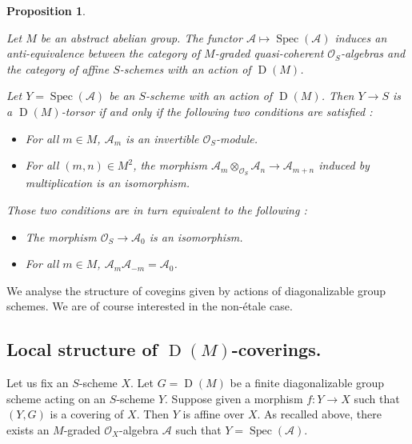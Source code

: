 \documentclass{amsart}
\newtheorem{prop}{Proposition}[section]
\theoremstyle{definition}
\theoremstyle{remark}
\begin{document}
\begin{prop}
\label{diago}

Let $M$ be an abstract abelian group. The functor ${{\mathcal A}} \mapsto \operatorname{Spec}({{\mathcal A}})$ induces an anti-equivalence between the category of $M$-graded quasi-coherent ${{\mathcal O}}_S$-algebras and the category of affine $S$-schemes with an action of $\operatorname{D}(M)$.

\medskip

Let $Y=\operatorname{Spec}({{\mathcal A}})$ be an $S$-scheme with an action of $\operatorname{D}(M)$. Then $Y {\longrightarrow} S$ is a $\operatorname{D}(M)$-torsor if and only if the following two conditions are satisfied : 

\begin{itemize}

\item[(a)] For all $m \in M$, ${{\mathcal A}}_m$ is an invertible ${{\mathcal O}}_S$-module.
\item[(b)] For all $(m,n) \in M^2$, the morphism ${{\mathcal A}}_m \otimes_{{{\mathcal O}}_S} {{\mathcal A}}_n {\longrightarrow} {{\mathcal A}}_{m+n}$ induced by multiplication is an isomorphism.
\end{itemize}
Those two conditions are in turn equivalent to the following : 

\begin{itemize}

\item[(a')] The morphism ${{\mathcal O}}_S {\longrightarrow} {{\mathcal A}}_0$ is an isomorphism.
\item[(b')] For all $m \in M$, ${{\mathcal A}}_m {{\mathcal A}}_{-m} = {{\mathcal A}}_0$.

\end{itemize}

\end{prop}

We analyse the structure of covegins given by actions of diagonalizable group schemes. We are of course interested in the non-\'etale case.

\subsection{Local structure of $\operatorname{D}(M)$-coverings.}

Let us fix an $S$-scheme $X$. Let $G = \operatorname{D}(M)$ be a finite diagonalizable group scheme acting on an $S$-scheme $Y$. Suppose given a morphism $f : Y {\longrightarrow} X$ such that $(Y,G)$ is a covering of $X$. Then $Y$ is affine over $X$. As recalled above, there exists an $M$-graded ${{\mathcal O}}_X$-algebra ${{\mathcal A}}$ such that $Y = \operatorname{Spec}({{\mathcal A}})$. 
\end{document}
